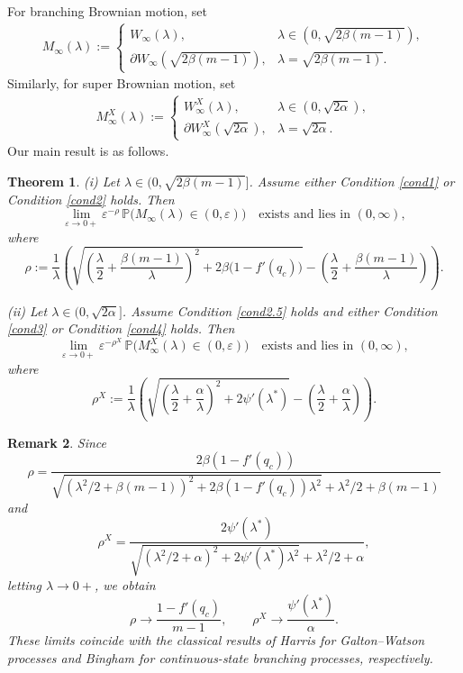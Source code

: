 \documentclass[11pt]{article}
\newtheorem{thrm}{Theorem}[section]
\newtheorem{remark}[thrm]{Remark}
\numberwithin{equation}{section}
\begin{document}
For branching Brownian motion, set
\begin{align*}	
	M_\infty(\lambda) := 
	\begin{cases}
		W_\infty(\lambda), & \lambda \in (0, \sqrt{2\beta(m-1)}), \\[4pt]
		\partial W_\infty(\sqrt{2\beta(m-1)}), & \lambda = \sqrt{2\beta(m-1)}.
	\end{cases}
\end{align*}
Similarly, for super Brownian motion, set
\begin{align*}	
	M_\infty^X(\lambda) := 
	\begin{cases}
		W_\infty^X(\lambda), & \lambda \in (0, \sqrt{2\alpha}), \\[4pt]
		\partial W_\infty^X(\sqrt{2\alpha}), & \lambda = \sqrt{2\alpha}.
	\end{cases}
\end{align*}
Our main result is as follows. 
\begin{thrm}\label{main result}
(i) Let $\lambda \in (0, \sqrt{2\beta(m-1)}]$. Assume either Condition \ref{cond1} or Condition \ref{cond2} holds. Then
\[
\lim_{\varepsilon \to 0+} \varepsilon^{-\rho} \, \mathbb{P}\bigl( M_\infty(\lambda) \in (0, \varepsilon) \bigr) \quad \text{exists and lies in } (0, \infty),
\]
where
\[
\rho := \frac{1}{\lambda} \left( \sqrt{ \left( \frac{\lambda}{2} + \frac{\beta(m-1)}{\lambda} \right)^2 + 2\beta \bigl(1 - f'(q_c)\bigr) } - \left( \frac{\lambda}{2} + \frac{\beta(m-1)}{\lambda} \right) \right).
\]

(ii) Let $\lambda \in (0, \sqrt{2\alpha}]$. Assume Condition \ref{cond2.5} holds and either Condition \ref{cond3} or Condition \ref{cond4} holds. Then
\[
\lim_{\varepsilon \to 0+} \varepsilon^{-\rho^X} \, \mathbb{P}\bigl( M_\infty^X(\lambda) \in (0, \varepsilon) \bigr) \quad \text{exists and lies in } (0, \infty),
\]
where
\[
\rho^X := \frac{1}{\lambda} \left( \sqrt{ \left( \frac{\lambda}{2} + \frac{\alpha}{\lambda} \right)^2 + 2 \psi'(\lambda^*) } - \left( \frac{\lambda}{2} + \frac{\alpha}{\lambda} \right) \right).
\]	
\end{thrm}



\begin{remark}
Since
\[
\rho = \frac{2\beta (1 - f'(q_c))}{
	\sqrt{ (\lambda^2/2 + \beta(m-1))^2 + 2\beta (1 - f'(q_c)) \lambda^2 } + \lambda^2/2 + \beta(m-1)
}
\]
and
\[
\rho^X = \frac{2 \psi'(\lambda^*)}{
	\sqrt{ (\lambda^2/2 + \alpha)^2 + 2 \psi'(\lambda^*) \lambda^2 } + \lambda^2/2 + \alpha},
\]
letting $\lambda \to 0+$, we obtain
\[
\rho \to \frac{1 - f'(q_c)}{m - 1}, \qquad
\rho^X \to \frac{\psi'(\lambda^*)}{\alpha}.
\]
These limits coincide with the classical results of Harris \cite{Harris1963} for Galton--Watson processes and Bingham \cite{Bingham} for continuous-state branching processes, respectively.	
\end{remark}
\end{document}
